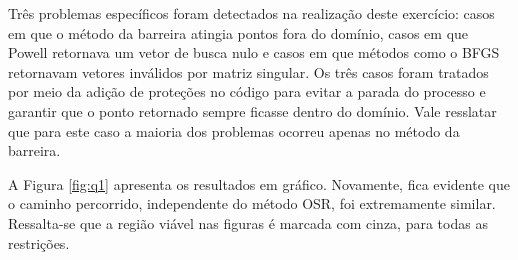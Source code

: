 \documentclass[10pt, a4paper]{article}
\begin{document}
Três problemas específicos foram detectados na realização deste exercício: casos em que o método da barreira atingia pontos fora do domínio, casos em que Powell
retornava um vetor de busca nulo e casos em que métodos como o BFGS retornavam vetores inválidos por matriz singular. Os três casos foram tratados por meio da adição
de proteções no código para evitar a parada do processo e garantir que o ponto retornado sempre ficasse dentro do domínio. Vale resslatar que para este caso a maioria 
dos problemas ocorreu apenas no método da barreira.

A Figura \ref{fig:q1} apresenta os resultados em gráfico. Novamente, fica evidente que o caminho percorrido, independente do método OSR, foi extremamente similar.
Ressalta-se que a região viável nas figuras é marcada com cinza, para todas as restrições.
\end{document}
